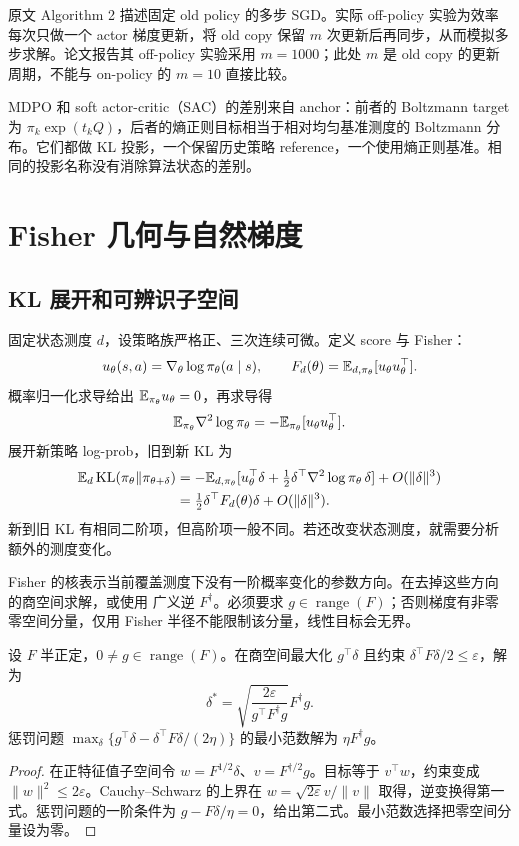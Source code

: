 原文 Algorithm 2 描述固定 old policy 的多步 SGD。实际 off-policy 实验为效率每次只做一个 actor 梯度更新，将 old copy 保留 $m$ 次更新后再同步，从而模拟多步求解。论文报告其 off-policy 实验采用 $m=1000$；此处 $m$ 是 old copy 的更新周期，不能与 on-policy 的 $m=10$ 直接比较。

MDPO 和 soft actor-critic（SAC）的差别来自 anchor：前者的 Boltzmann target 为 $\pi_k\exp(t_kQ)$，后者的熵正则目标相当于相对均匀基准测度的 Boltzmann 分布。它们都做 KL 投影，一个保留历史策略 reference，一个使用熵正则基准。相同的投影名称没有消除算法状态的差别。

\section{Fisher 几何与自然梯度}

\subsection{KL 展开和可辨识子空间}

固定状态测度 $d$，设策略族严格正、三次连续可微。定义 score 与 Fisher：
\[
 u_\theta(s,a)=\nabla_\theta\log\pi_\theta(a\mid s),\qquad
 F_d(\theta)=\mathbb{E}_{d,\pi_\theta}[u_\theta u_\theta^\top].
\]
概率归一化求导给出 $\mathbb{E}_{\pi_\theta}u_\theta=0$，再求导得
\[
 \mathbb{E}_{\pi_\theta}\nabla^2\log\pi_\theta
 =-\mathbb{E}_{\pi_\theta}[u_\theta u_\theta^\top].
\]
展开新策略 log-prob，旧到新 KL 为
\begin{align*}
 \mathbb{E}_d\operatorname{KL}(\pi_\theta\Vert\pi_{\theta+\delta})
 &=-\mathbb{E}_{d,\pi_\theta}
 [u_\theta^\top\delta+\tfrac12\delta^\top\nabla^2\log\pi_\theta\,\delta]
 +O(\lVert\delta\rVert^3)\\
 &=\tfrac12\delta^\top F_d(\theta)\delta+O(\lVert\delta\rVert^3).
\end{align*}
新到旧 KL 有相同二阶项，但高阶项一般不同。若还改变状态测度，就需要分析额外的测度变化。

Fisher 的核表示当前覆盖测度下没有一阶概率变化的参数方向。在去掉这些方向的商空间求解，或使用 广义逆 $F^\dagger$。必须要求 $g\in\operatorname{range}(F)$；否则梯度有非零零空间分量，仅用 Fisher 半径不能限制该分量，线性目标会无界。

\begin{proposition}
\label{prop:foundation-natural-trust}
设 $F$ 半正定，$0\neq g\in\operatorname{range}(F)$。在商空间最大化 $g^\top\delta$ 且约束 $\delta^\top F\delta/2\leq\varepsilon$，解为
\[
 \delta^*=\sqrt{\frac{2\varepsilon}{g^\top F^\dagger g}}F^\dagger g.
\]
惩罚问题 $\max_\delta\{g^\top\delta-\delta^\top F\delta/(2\eta)\}$ 的最小范数解为 $\eta F^\dagger g$。
\end{proposition}
\begin{proof}
在正特征值子空间令 $w=F^{1/2}\delta$、$v=F^{\dagger/2}g$。目标等于 $v^\top w$，约束变成 $\lVert w\rVert^2\leq2\varepsilon$。Cauchy--Schwarz 的上界在 $w=\sqrt{2\varepsilon}v/\lVert v\rVert$ 取得，逆变换得第一式。惩罚问题的一阶条件为 $g-F\delta/\eta=0$，给出第二式。最小范数选择把零空间分量设为零。
\end{proof}

